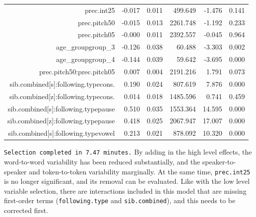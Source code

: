 \documentclass[a4paper]{article}
\begin{document}
{\begin{tabular}{rrrrrr}
$$  prec.int25 & -0.017 & 0.011 & 499.649 & -1.476 & 0.141 \\
  prec.pitch50 & -0.015 & 0.013 & 2261.748 & -1.192 & 0.233 \\
  prec.pitch05 & -0.000 & 0.011 & 2392.557 & -0.045 & 0.964 \\
  age\_groupgroup\_3 & -0.126 & 0.038 & 60.488 & -3.303 & 0.002 \\
  age\_groupgroup\_4 & -0.144 & 0.039 & 59.642 & -3.695 & 0.000 \\
  prec.pitch50:prec.pitch05 & 0.007 & 0.004 & 2191.216 & 1.791 & 0.073 \\
  sib.combined[s]:following.typecons. & 0.190 & 0.024 & 807.619 & 7.876 & 0.000 \\
  sib.combined[z]:following.typecons. & 0.014 & 0.018 & 1485.596 & 0.741 & 0.459 \\
  sib.combined[s]:following.typepause & 0.510 & 0.035 & 1553.364 & 14.595 & 0.000 \\
  sib.combined[z]:following.typepause & 0.418 & 0.025 & 2067.947 & 17.007 & 0.000 \\
  sib.combined[s]:following.typevowel & 0.213 & 0.021 & 878.092 & 10.320 & 0.000 \\
   \hline
\end{tabular}
}\endgroup\newline\newline\newline\texttt{Selection completed in 7.47 minutes.}\newline\newline
By adding in the high level effects, the word-to-word
variability has been reduced substantially, and the speaker-to-speaker
and token-to-token variability marginally.  At the same time,
\texttt{prec.int25} is no longer significant, and its removal can be
evaluated.  Like with the low level variable selection, there are
interactions included in this model that are missing first-order terms
(\texttt{following.type} and \texttt{sib.combined}), and  this needs
to be corrected first.
\end{document}
